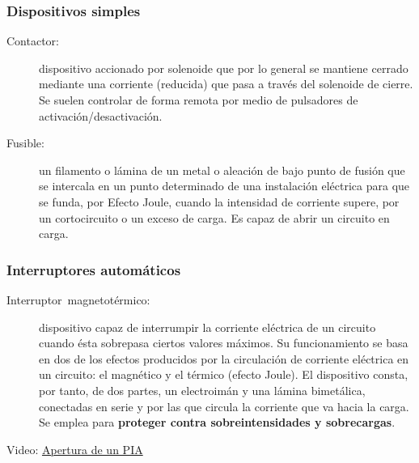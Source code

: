 \documentclass[serif, xcolor=dvipsnames]{beamer}
\begin{document}
\begin{frame}
  \frametitle{Dispositivos simples}
  \begin{description}
  \item [{Contactor:}] dispositivo accionado por solenoide que por lo
    general se mantiene cerrado mediante una corriente (reducida) que
    pasa a través del solenoide de cierre. Se suelen controlar de
    forma remota por medio de pulsadores de activación/desactivación.
  \item [{Fusible:}] un filamento o lámina de un metal o aleación de
    bajo punto de fusión que se intercala en un punto determinado de
    una instalación eléctrica para que se funda, por Efecto Joule,
    cuando la intensidad de corriente supere, por un cortocircuito o
    un exceso de carga. Es capaz de abrir un circuito en carga.
  \end{description}

\end{frame}
\begin{frame}
  \frametitle{Interruptores automáticos}
  \begin{description}
  \item [{Interruptor~magnetotérmico:}] dispositivo capaz de
    interrumpir la corriente eléctrica de un circuito cuando ésta
    sobrepasa ciertos valores máximos. Su funcionamiento se basa en
    dos de los efectos producidos por la circulación de corriente
    eléctrica en un circuito: el magnético y el térmico (efecto
    Joule). El dispositivo consta, por tanto, de dos partes, un
    electroimán y una lámina bimetálica, conectadas en serie y por las
    que circula la corriente que va hacia la carga. Se emplea para
    \textbf{proteger contra sobreintensidades y sobrecargas}.
  \end{description}
  \begin{block}{}
    \centering Video:
    \href{http://www.youtube.com/watch?v=c6QqnLgWbCQ}{Apertura de un
      PIA}
  \end{block}

\end{frame}
\end{document}

